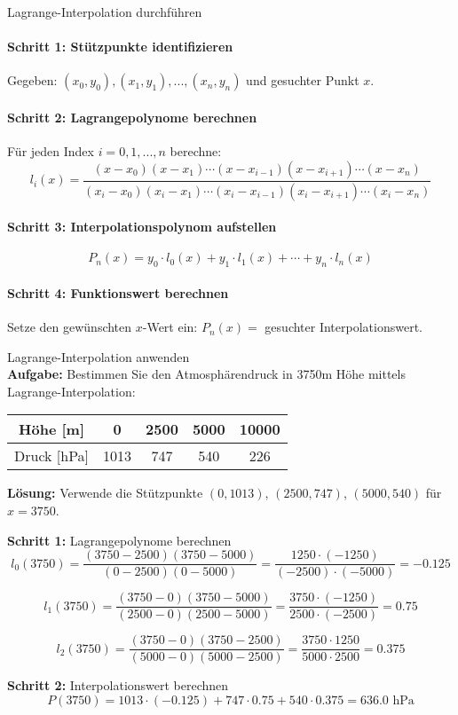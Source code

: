 \begin{KR}{Lagrange-Interpolation durchführen}\\
\paragraph{Schritt 1: Stützpunkte identifizieren}
Gegeben: $(x_0, y_0), (x_1, y_1), ..., (x_n, y_n)$ und gesuchter Punkt $x$.

\paragraph{Schritt 2: Lagrangepolynome berechnen}
Für jeden Index $i = 0, 1, ..., n$ berechne:
$$l_i(x) = \frac{(x-x_0)(x-x_1)\cdots(x-x_{i-1})(x-x_{i+1})\cdots(x-x_n)}{(x_i-x_0)(x_i-x_1)\cdots(x_i-x_{i-1})(x_i-x_{i+1})\cdots(x_i-x_n)}$$

\paragraph{Schritt 3: Interpolationspolynom aufstellen}
$$P_n(x) = y_0 \cdot l_0(x) + y_1 \cdot l_1(x) + \cdots + y_n \cdot l_n(x)$$

\paragraph{Schritt 4: Funktionswert berechnen}
Setze den gewünschten $x$-Wert ein: $P_n(x) = $ gesuchter Interpolationswert.
\end{KR}

\begin{example2}{Lagrange-Interpolation anwenden}\\
\textbf{Aufgabe:} Bestimmen Sie den Atmosphärendruck in 3750m Höhe mittels Lagrange-Interpolation:
\begin{center}
\begin{tabular}{|c|c|c|c|c|}
\hline
Höhe [m] & 0 & 2500 & 5000 & 10000 \\
\hline
Druck [hPa] & 1013 & 747 & 540 & 226 \\
\hline
\end{tabular}
\end{center}
\tcblower
\textbf{Lösung:}
Verwende die Stützpunkte $(0, 1013)$, $(2500, 747)$, $(5000, 540)$ für $x = 3750$.

\textbf{Schritt 1:} Lagrangepolynome berechnen
$$l_0(3750) = \frac{(3750-2500)(3750-5000)}{(0-2500)(0-5000)} = \frac{1250 \cdot (-1250)}{(-2500) \cdot (-5000)} = -0.125$$

$$l_1(3750) = \frac{(3750-0)(3750-5000)}{(2500-0)(2500-5000)} = \frac{3750 \cdot (-1250)}{2500 \cdot (-2500)} = 0.75$$

$$l_2(3750) = \frac{(3750-0)(3750-2500)}{(5000-0)(5000-2500)} = \frac{3750 \cdot 1250}{5000 \cdot 2500} = 0.375$$

\textbf{Schritt 2:} Interpolationswert berechnen
$$P(3750) = 1013 \cdot (-0.125) + 747 \cdot 0.75 + 540 \cdot 0.375 = 636.0 \text{ hPa}$$
\end{example2}

